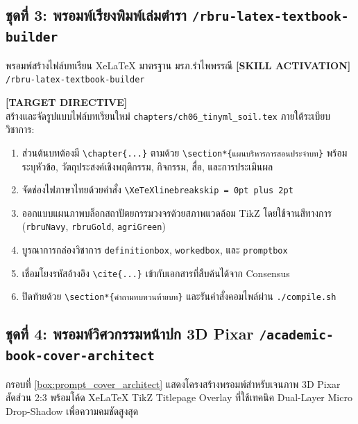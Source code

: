 \subsection{ชุดที่ 3: พรอมพ์เรียงพิมพ์เล่มตำรา \texttt{/rbru-latex-textbook-builder}}

\begin{promptbox}{พรอมพ์สร้างไฟล์บทเรียน XeLaTeX มาตรฐาน มรภ.รำไพพรรณี}
\small
\textbf{[SKILL ACTIVATION]}\\
\texttt{/rbru-latex-textbook-builder}

\vspace{4pt}
\textbf{[TARGET DIRECTIVE]}\\
สร้างและจัดรูปแบบไฟล์บทเรียนใหม่ \texttt{chapters/ch06\_tinyml\_soil.tex} ภายใต้ระเบียบวิชาการ:
\begin{enumerate}[leftmargin=15pt, itemsep=1pt]
    \item ส่วนต้นบทต้องมี \texttt{\textbackslash chapter\{...\}} ตามด้วย \texttt{\textbackslash section*\{แผนบริหารการสอนประจำบท\}} พร้อมระบุหัวข้อ, วัตถุประสงค์เชิงพฤติกรรม, กิจกรรม, สื่อ, และการประเมินผล
    \item จัดช่องไฟภาษาไทยด้วยคำสั่ง \texttt{\textbackslash XeTeXlinebreakskip = 0pt plus 2pt}
    \item ออกแบบแผนภาพบล็อกสถาปัตยกรรมวงจรด้วยสภาพแวดล้อม TikZ โดยใช้จานสีทางการ (\texttt{rbruNavy}, \texttt{rbruGold}, \texttt{agriGreen})
    \item บูรณาการกล่องวิชาการ \texttt{definitionbox}, \texttt{workedbox}, และ \texttt{promptbox}
    \item เชื่อมโยงรหัสอ้างอิง \texttt{\textbackslash cite\{...\}} เข้ากับเอกสารที่สืบค้นได้จาก Consensus
    \item ปิดท้ายด้วย \texttt{\textbackslash section*\{คำถามทบทวนท้ายบท\}} และรันคำสั่งคอมไพล์ผ่าน \texttt{./compile.sh}
\end{enumerate}
\end{promptbox}
\label{box:prompt_latex_builder}

\subsection{ชุดที่ 4: พรอมพ์วิศวกรรมหน้าปก 3D Pixar \texttt{/academic-book-cover-architect}}

กรอบที่ \ref{box:prompt_cover_architect} แสดงโครงสร้างพรอมพ์สำหรับเจนภาพ 3D Pixar สัดส่วน 2:3 พร้อมโค้ด XeLaTeX TikZ Titlepage Overlay ที่ใช้เทคนิค Dual-Layer Micro Drop-Shadow เพื่อความคมชัดสูงสุด

